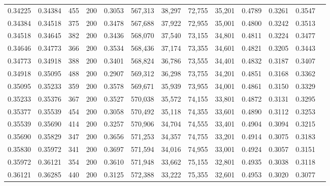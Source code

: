 \begin{tabular}{rrrrrrrrrrrrr}
0.34225 & 0.34384 &    455 & 200 &                                     0.3053 & 567,313 &  38,297 &  72,755 &  35,201 & 0.4789 & 0.3261 & 0.3547 \\
0.34384 & 0.34518 &    375 & 200 &                                     0.3478 & 567,688 &  37,922 &  72,955 &  35,001 & 0.4800 & 0.3242 & 0.3513 \\
0.34518 & 0.34645 &    382 & 200 &                                     0.3436 & 568,070 &  37,540 &  73,155 &  34,801 & 0.4811 & 0.3224 & 0.3477 \\
0.34646 & 0.34773 &    366 & 200 &                                     0.3534 & 568,436 &  37,174 &  73,355 &  34,601 & 0.4821 & 0.3205 & 0.3443 \\
0.34773 & 0.34918 &    388 & 200 &                                     0.3401 & 568,824 &  36,786 &  73,555 &  34,401 & 0.4832 & 0.3187 & 0.3407 \\
0.34918 & 0.35095 &    488 & 200 &                                     0.2907 & 569,312 &  36,298 &  73,755 &  34,201 & 0.4851 & 0.3168 & 0.3362 \\
0.35095 & 0.35233 &    359 & 200 &                                     0.3578 & 569,671 &  35,939 &  73,955 &  34,001 & 0.4861 & 0.3150 & 0.3329 \\
0.35233 & 0.35376 &    367 & 200 &                                     0.3527 & 570,038 &  35,572 &  74,155 &  33,801 & 0.4872 & 0.3131 & 0.3295 \\
0.35377 & 0.35539 &    454 & 200 &                                     0.3058 & 570,492 &  35,118 &  74,355 &  33,601 & 0.4890 & 0.3112 & 0.3253 \\
0.35539 & 0.35690 &    414 & 200 &                                     0.3257 & 570,906 &  34,704 &  74,555 &  33,401 & 0.4904 & 0.3094 & 0.3215 \\
0.35690 & 0.35829 &    347 & 200 &                                     0.3656 & 571,253 &  34,357 &  74,755 &  33,201 & 0.4914 & 0.3075 & 0.3183 \\
0.35830 & 0.35972 &    341 & 200 &                                     0.3697 & 571,594 &  34,016 &  74,955 &  33,001 & 0.4924 & 0.3057 & 0.3151 \\
0.35972 & 0.36121 &    354 & 200 &                                     0.3610 & 571,948 &  33,662 &  75,155 &  32,801 & 0.4935 & 0.3038 & 0.3118 \\
0.36121 & 0.36285 &    440 & 200 &                                     0.3125 & 572,388 &  33,222 &  75,355 &  32,601 & 0.4953 & 0.3020 & 0.3077 \\

\end{tabular}

